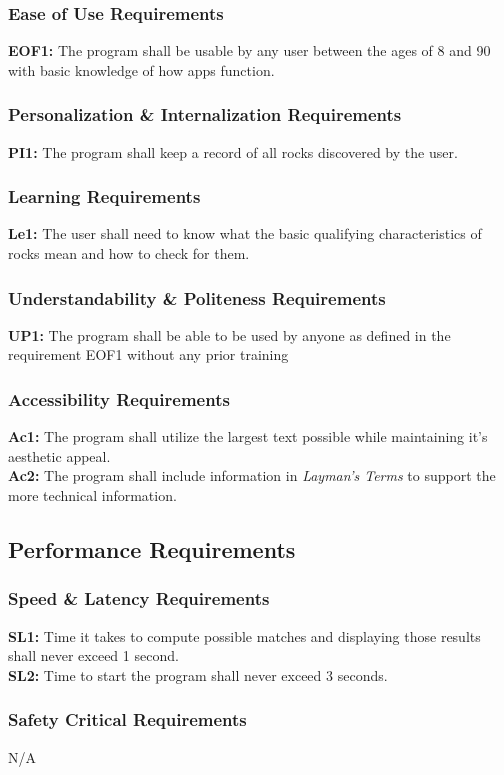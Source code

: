 \documentclass[titlepage]{article}
\begin{document}
\subsubsection{Ease of Use Requirements}
\textbf{EOF1:} The program shall be usable by any user between the ages of 8 and 90 with basic knowledge of how apps function.
\subsubsection{Personalization \& Internalization Requirements}
\textbf{PI1:} The program shall keep a record of all rocks discovered by the user.
\subsubsection{Learning Requirements}
\textbf{Le1:} The user shall need to know what the basic qualifying characteristics of rocks mean and how to check for them.
\subsubsection{Understandability \& Politeness Requirements}
\textbf{UP1:} The program shall be able to be used by anyone as defined in the requirement EOF1 without any prior training
\subsubsection{Accessibility Requirements}
\textbf{Ac1:} The program shall utilize the largest text possible while maintaining it's aesthetic appeal.\\

\noindent\textbf{Ac2:} The program shall include information in \textit{Layman's Terms} to support the more technical information.

\subsection{Performance Requirements}
\subsubsection{Speed \& Latency Requirements}
\textbf{SL1:} Time it takes to compute possible matches and displaying those results shall never exceed 1 second.\\

\noindent\textbf{SL2:} Time to start the program shall never exceed 3 seconds.
\subsubsection{Safety Critical Requirements}
N/A
\end{document}
